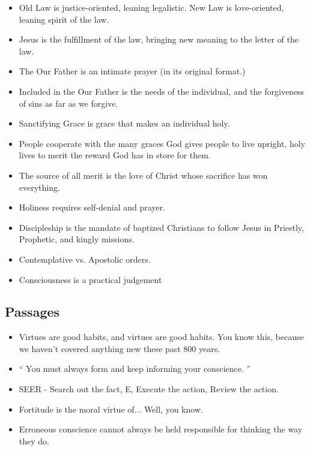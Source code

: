 \documentclass[11pt]{article}
\begin{document}
\begin{itemize}
	\item Old Law is justice-oriented, leaning legalistic.  New Law 
		is love-oriented,	leaning spirit of the law.
	\item Jesus is the fulfillment of the law, bringing new meaning 
		to the letter	of the law.
	\item The Our Father is an intimate prayer (in its original 
		format.)
	\item Included in the Our Father is the needs of the individual,
		and	the forgiveness of sins as far as we forgive.
	\item Sanctifying Grace is grace that makes an individual holy.
	\item People cooperate with the many graces God gives people 
		to live upright, holy lives to merit the reward God has in 
		store	for them.
	\item The source of all merit is the love of Christ whose 
		sacrifice has won everything.
	\item Holiness requires self-denial and prayer.
	\item Discipleship is the mandate of baptized Christians to 
		follow Jesus in Priestly, Prophetic, and kingly missions.
	\item Contemplative vs. Apostolic orders.
	\item Consciousness is a practical judgement
\end{itemize}
\subsection{Passages}
\begin{itemize}
	\item Virtues are good habits, and virtues are
		good habits.  You know this, because we haven't
		covered anything new these past 800 years.
	\item `` You must always form and keep informing
		your conscience. ''
	\item SEER - Search out the fact, E, Execute the
		action, Review the action.
	\item Fortitude is the moral virtue of... Well, you know.
	\item Erroneous conscience cannot always be held responsible
		for thinking the way they do.
\end{itemize}
\end{document}
